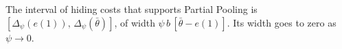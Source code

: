 \label{cor:att_band}
The interval of hiding costs that supports Partial Pooling is $[\Delta_\psi(e(1)),\,\Delta_\psi(\bar\theta)]$, of width $\psi\,b\,[\bar\theta-e(1)]$. Its width goes to zero as $\psi\to0$.
